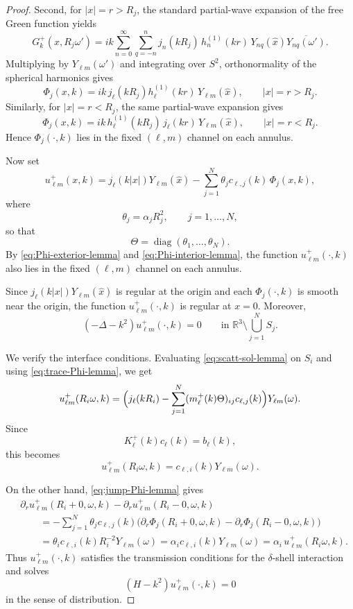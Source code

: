 \documentclass[a4paper,11pt]{article}
\numberwithin{equation}{section}
\newcommand{\R}{\mathbb{R}}
\newcommand{\diag}{\operatorname{diag}}
\newcommand{\jj}[1]{j_{#1}}
\newcommand{\hj}[1]{h^{(1)}_{#1}}
\theoremstyle{definition}
\theoremstyle{remark}
\begin{document}
\begin{proof}
Second, for $|x|=r>R_j$, the standard partial-wave expansion of the free Green
function yields
\[
G_k^+(x,R_j\omega')
=
ik\sum_{n=0}^\infty \sum_{q=-n}^n
j_n(kR_j)\,h_n^{(1)}(kr)\,
Y_{nq}(\widehat x)\overline{Y_{nq}(\omega')}.
\]
Multiplying by $Y_{\ell m}(\omega')$ and integrating over $S^2$, orthonormality of
the spherical harmonics gives
\begin{equation}\label{eq:Phi-exterior-lemma}
\Phi_j(x,k)
=
ik\,\jj{\ell}(kR_j)\hj{\ell}(kr)\,Y_{\ell m}(\widehat x),
\qquad |x|=r>R_j.
\end{equation}
Similarly, for $|x|=r<R_j$, the same partial-wave expansion gives
\begin{equation}\label{eq:Phi-interior-lemma}
\Phi_j(x,k)
=
ik\,\hj{\ell}(kR_j)\,\jj{\ell}(kr)\,Y_{\ell m}(\widehat x),
\qquad |x|=r<R_j.
\end{equation}
Hence $\Phi_j(\cdot,k)$ lies in the fixed $(\ell,m)$ channel on each annulus.

Now set
\begin{equation}\label{eq:scatt-sol-lemma}
u_{\ell m}^+(x,k)
=
\jj{\ell}(k|x|)Y_{\ell m}(\widehat x)
-
\sum_{j=1}^N \theta_j c_{\ell,j}(k)\,\Phi_j(x,k),
\end{equation}
where
\[
\theta_j=\alpha_jR_j^2,
\qquad j=1,\ldots,N,
\]
so that
\[
\Theta=\diag(\theta_1,\ldots,\theta_N).
\]
By \eqref{eq:Phi-exterior-lemma} and \eqref{eq:Phi-interior-lemma},
the function $u_{\ell m}^+(\cdot,k)$ also lies in the fixed $(\ell,m)$
channel on each annulus.

Since $\jj{\ell}(k|x|)Y_{\ell m}(\widehat x)$ is regular at the origin and each
$\Phi_j(\cdot,k)$ is smooth near the origin, the function
$u_{\ell m}^+(\cdot,k)$ is regular at $x=0$. Moreover,
\[
(-\Delta-k^2)u_{\ell m}^+(\cdot,k)=0
\qquad \text{in }\R^3\setminus\bigcup_{j=1}^N S_j.
\]

We verify the interface conditions. Evaluating
\eqref{eq:scatt-sol-lemma} on $S_i$ and using
\eqref{eq:trace-Phi-lemma}, we get
\[
u_{\ell m}^+(R_i\omega,k)
=
\Bigl(
\jj{\ell}(kR_i)-\sum_{j=1}^N (m_\ell^+(k)\Theta)_{ij}c_{\ell,j}(k)
\Bigr)Y_{\ell m}(\omega).
\]
Since
\[
K_\ell^+(k)c_\ell(k)=b_\ell(k),
\]
this becomes
\[
u_{\ell m}^+(R_i\omega,k)=c_{\ell,i}(k)Y_{\ell m}(\omega).
\]

On the other hand, \eqref{eq:jump-Phi-lemma} gives
\begin{align*}
&\partial_r u_{\ell m}^+(R_i+0,\omega,k)
-
\partial_r u_{\ell m}^+(R_i-0,\omega,k)
\\
&\qquad
=
-\sum_{j=1}^N \theta_j c_{\ell,j}(k)
\bigl(
\partial_r\Phi_j(R_i+0,\omega,k)
-
\partial_r\Phi_j(R_i-0,\omega,k)
\bigr)
\\
&\qquad
=
\theta_i c_{\ell,i}(k)R_i^{-2}Y_{\ell m}(\omega)
=
\alpha_i c_{\ell,i}(k)Y_{\ell m}(\omega)
=
\alpha_i\,u_{\ell m}^+(R_i\omega,k).
\end{align*}
Thus $u_{\ell m}^+(\cdot,k)$ satisfies the transmission conditions for the
$\delta$-shell interaction and solves
\[
(H-k^2)u_{\ell m}^+(\cdot,k)=0
\]
in the sense of distribution.


\end{proof}
\end{document}
